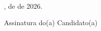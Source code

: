 \vspace{3em}

\noindent\makebox[5cm]{\hrulefill}, \makebox[2cm]{\hrulefill} de \makebox[3cm]{\hrulefill} de 2026.

\vspace{5em}

\noindent\makebox[12cm]{\hrulefill}

\noindent Assinatura do(a) Candidato(a)
